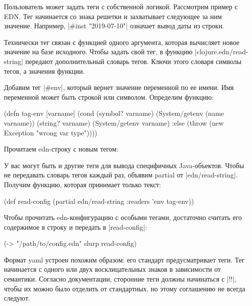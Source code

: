 Пользователь может задать теги с собственной логикой. Рассмотрим пример с
EDN. Тег начинается со знака решетки и захватывает следующее за ним
значение. Например, \spverb|#inst "2019-07-10"| означает вывод даты из строки.

Технически тег связан с функцией одного аргумента, которая вычисляет новое
значение на базе исходного. Чтобы задать свой тег, в функцию
\spverb|clojure.edn/read-string| передают дополнительный словарь тегов. Ключи этого
словаря символы тегов, а значения функции.

Добавим тег \spverb|#env|, который вернет значение переменной по ее имени. Имя
переменной может быть строкой или символом. Определим функцию:

\begin{code}
(defn tag-env
  [varname]
  (cond
    (symbol? varname)
    (System/getenv (name varname))
    (string? varname)
    (System/getenv varname)
    :else
    (throw (new Exception "wrong var type"))))
\end{code}

Прочитаем edn-строку с новым тегом:

\begin{code}
(require '[clojure.edn :as edn])

(edn/read-string
 {:readers {'env tag-env}}
 "{:db-password #env DB_PASS}")

;; {:db-password "*(&fd}A53z#$!"}
\end{code}

У вас могут быть и другие теги для вывода специфичных Java-объектов. Чтобы не
передавать словарь тегов каждый раз, объявим partial от
\spverb|edn/read-string|. Получим функцию, которая принимает только текст:

\begin{code}
(def read-config
  (partial edn/read-string
           {:readers {'env tag-env}}))
\end{code}

Чтобы прочитать edn-конфигурацию с особыми тегами, достаточно считать его
содержимое в строку и передать в \spverb|read-config|:

\begin{code}
(-> "/path/to/config.edn"
    slurp
    read-config)
\end{code}

Формат yaml устроен похожим образом: его стандарт предусматривает теги. Тег
начинается с одного или двух восклицательных знаков в зависимости от
семантики. Согласно документации, сторонние теги должны начинаться с \spverb|!!|, чтобы
их можно было отделить от стандартных, но этому соглашению не всегда следуют.

